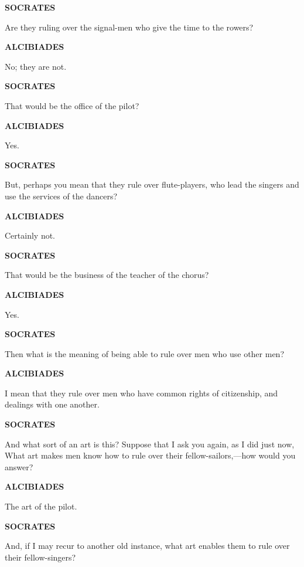 \documentclass[11pt,letter]{article}
\begin{document}
\par \textbf{SOCRATES}
\par   Are they ruling over the signal-men who give the time to the rowers?

\par \textbf{ALCIBIADES}
\par   No; they are not.

\par \textbf{SOCRATES}
\par   That would be the office of the pilot?

\par \textbf{ALCIBIADES}
\par   Yes.

\par \textbf{SOCRATES}
\par   But, perhaps you mean that they rule over flute-players, who lead the singers and use the services of the dancers?

\par \textbf{ALCIBIADES}
\par   Certainly not.

\par \textbf{SOCRATES}
\par   That would be the business of the teacher of the chorus?

\par \textbf{ALCIBIADES}
\par   Yes.

\par \textbf{SOCRATES}
\par   Then what is the meaning of being able to rule over men who use other men?

\par \textbf{ALCIBIADES}
\par   I mean that they rule over men who have common rights of citizenship, and dealings with one another.

\par \textbf{SOCRATES}
\par   And what sort of an art is this? Suppose that I ask you again, as I did just now, What art makes men know how to rule over their fellow-sailors,—how would you answer?

\par \textbf{ALCIBIADES}
\par   The art of the pilot.

\par \textbf{SOCRATES}
\par   And, if I may recur to another old instance, what art enables them to rule over their fellow-singers?
\end{document}
